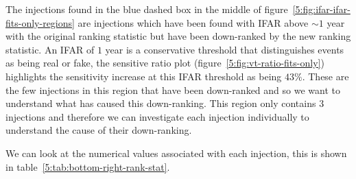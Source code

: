 The injections found in the blue dashed box in the middle of figure~\ref{5:fig:ifar-ifar-fits-only-regions} are injections which have been found with IFAR above $\sim1$ year with the original ranking statistic but have been down-ranked by the new ranking statistic. An IFAR of $1$ year is a conservative threshold that distinguishes \gwadj events as being real or fake, the sensitive ratio plot (figure~\ref{5:fig:vt-ratio-fits-only}) highlights the sensitivity increase at this IFAR threshold as being $43\%$. These are the few injections in this region that have been down-ranked and so we want to understand what has caused this down-ranking. This region only contains $3$ injections and therefore we can investigate each injection individually to understand the cause of their down-ranking.

We can look at the numerical values associated with each injection, this is shown in table~\ref{5:tab:bottom-right-rank-stat}.
%
